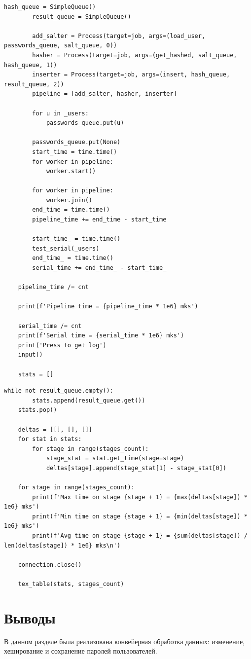 \documentclass[a4paper,oneside,14pt]{extreport}
\begin{document}
\begin{lstlisting}[caption=Файл master.py (часть 4)]
		hash_queue = SimpleQueue()
		result_queue = SimpleQueue()

		add_salter = Process(target=job, args=(load_user, passwords_queue, salt_queue, 0))
		hasher = Process(target=job, args=(get_hashed, salt_queue, hash_queue, 1))
		inserter = Process(target=job, args=(insert, hash_queue, result_queue, 2))
		pipeline = [add_salter, hasher, inserter]

		for u in _users:
			passwords_queue.put(u)

		passwords_queue.put(None)
		start_time = time.time()
		for worker in pipeline:
			worker.start()

		for worker in pipeline:
			worker.join()
		end_time = time.time()
		pipeline_time += end_time - start_time

		start_time_ = time.time()
		test_serial(_users)
		end_time_ = time.time()
		serial_time += end_time_ - start_time_

	pipeline_time /= cnt

	print(f'Pipeline time = {pipeline_time * 1e6} mks')

	serial_time /= cnt
	print(f'Serial time = {serial_time * 1e6} mks')
	print('Press to get log')
	input()

	stats = []
\end{lstlisting}
\newpage
\begin{lstlisting}[caption=Файл master.py (часть 5)]
	while not result_queue.empty():
		stats.append(result_queue.get())
	stats.pop()

	deltas = [[], [], []]
	for stat in stats:
		for stage in range(stages_count):
			stage_stat = stat.get_time(stage=stage)
			deltas[stage].append(stage_stat[1] - stage_stat[0])

	for stage in range(stages_count):
		print(f'Max time on stage {stage + 1} = {max(deltas[stage]) * 1e6} mks')
		print(f'Min time on stage {stage + 1} = {min(deltas[stage]) * 1e6} mks')
		print(f'Avg time on stage {stage + 1} = {sum(deltas[stage]) / len(deltas[stage]) * 1e6} mks\n')

	connection.close()

	tex_table(stats, stages_count)
\end{lstlisting}
%

\section{Выводы}
В данном разделе была реализована конвейерная обработка данных: изменение, хеширование и сохранение паролей пользователей.
\newpage
\end{document}
